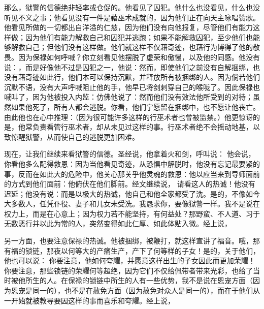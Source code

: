 那么，狱警的信德绝非轻率或仓促的。他看见了囚犯。他什么也没看见，什么也没听见不义之事；他看见没有一件是藉巫术成就的，因为他们正在向天主咏唱赞歌。他看见所做的一切都出自洋溢的仁慈，因为他们没有向他报复，尽管他们有能力这样做；因为他们有能力解救自己和囚犯并逃跑；如果不能解救囚犯，至少他们也能够解救自己；但他们没有这样做。他们就这样不仅藉奇迹，也藉行为博得了他的敬畏。因为保禄如何呼喊？你立刻看见他摆脱了虚荣和傲慢，以及他的同感。他没有说：，而是好像他不过是囚犯之一，他说：然而，即使他们之前没有自解捆绑，也没有藉奇迹如此行，他们本可以保持沉默，并释放所有被捆绑的人。因为倘若他们沉默不语，没有大声呼喊阻止他的手，他早已将剑刺穿自己的喉咙了。因此保禄也喊叫了，因为他被投入内监：仿佛他说了：然而他们没有效法他所受到的对待；虽然如果他死了，所有人都会逃脱。你看，他们宁愿留在捆绑中，也不愿让他丧亡。由此他也在心中推理：（因为很可能许多这样的行巫术者也曾被监禁。）他更惊讶的是，他常负责看管行巫术者，却从未见过这样的事。行巫术者绝不会摇动地基，以致惊醒狱警，从而使自己的逃脱更加困难。\par

现在，让我们继续来看狱警的信德。圣经说，他拿着火和剑，呼叫说：  他会说，你看他多么配得救恩：因为当他看见奇迹，从恐惧中解脱时，他没有忘记最要紧的事，反而在如此大的危险中，他关心那关乎他灵魂的救恩：他以应当来到导师面前的方式到他们面前：他俯伏在他们脚前。经文继续说，  请看这人的热诚！他没有迟延；他没有说：而是以极大的热诚，他自己和他全家都受了洗。是的，不像如今大多数人，任凭仆役、妻子和儿女未受洗。我恳求你，要像狱警一样。我不是说在权力上，而是在心意上；因为权力若不能坚持，有何益处？那野蛮、不人道、习于无数恶行并以此为常的人，突然变得如此仁厚、如此体贴入微。经上说，\par

另一方面，也要注意保禄的热诚。他被捆绑，被鞭打，就这样宣讲了福音。哦，那有福的锁链，那夜以何等大的产痛生产，产下了何等样的子女！是的，关于他们，他也可以说：  你要注意，他如何夸耀，并愿意这样出生的子女因此而更加荣耀！你要注意，那些锁链的荣耀何等超绝，因为它们不仅给佩带者带来光彩，也给了当时被他所生的人。在保禄的锁链中所生的人有一些优势，我不是说在恩宠方面（因为恩宠是同一的），也不是在赦免方面（因为赦免对众人是同一的），而在于他们从一开始就被教导要因这样的事而喜乐和夸耀。经上说，\par

